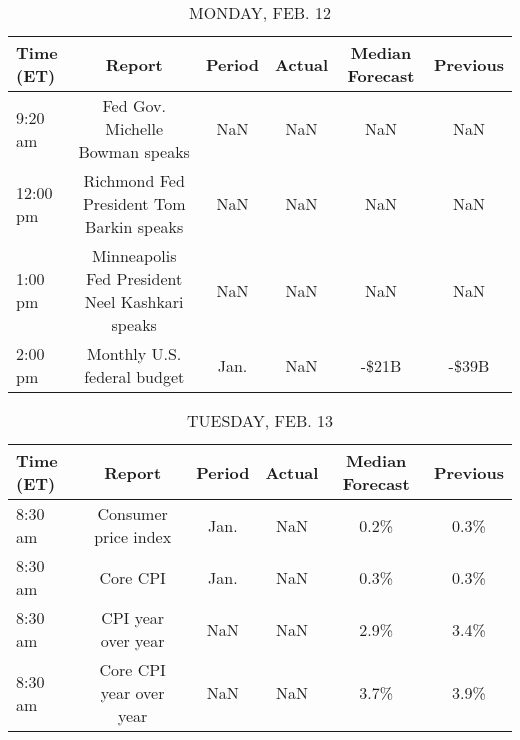 \documentclass{article}%
\begin{document}
%
\normalsize%


\begin{table}[htbp]%
\caption{MONDAY, FEB. 12}%
\centering%
\begin{adjustbox}{width=1\textwidth}%
\begin{tabular}{lccccc}
\toprule
Time (ET) &                                         Report & Period & Actual & Median Forecast & Previous \\
\midrule
  9:20 am &                Fed Gov. Michelle Bowman speaks &    NaN &    NaN &             NaN &      NaN \\
 12:00 pm &       Richmond Fed President Tom Barkin speaks &    NaN &    NaN &             NaN &      NaN \\
  1:00 pm & Minneapolis Fed President Neel Kashkari speaks &    NaN &    NaN &             NaN &      NaN \\
  2:00 pm &                    Monthly U.S. federal budget &   Jan. &    NaN &           -\$21B &    -\$39B \\
\bottomrule
\end{tabular}
%
\end{adjustbox}%
\end{table}

%


\begin{table}[htbp]%
\caption{TUESDAY, FEB. 13}%
\centering%
\begin{adjustbox}{width=1\textwidth}%
\begin{tabular}{lccccc}
\toprule
Time (ET) &                  Report & Period & Actual & Median Forecast & Previous \\
\midrule
  8:30 am &    Consumer price index &   Jan. &    NaN &            0.2\% &     0.3\% \\
  8:30 am &                Core CPI &   Jan. &    NaN &            0.3\% &     0.3\% \\
  8:30 am &      CPI year over year &    NaN &    NaN &            2.9\% &     3.4\% \\
  8:30 am & Core CPI year over year &    NaN &    NaN &            3.7\% &     3.9\% \\
\bottomrule
\end{tabular}
%
\end{adjustbox}%
\end{table}

%
\end{document}
